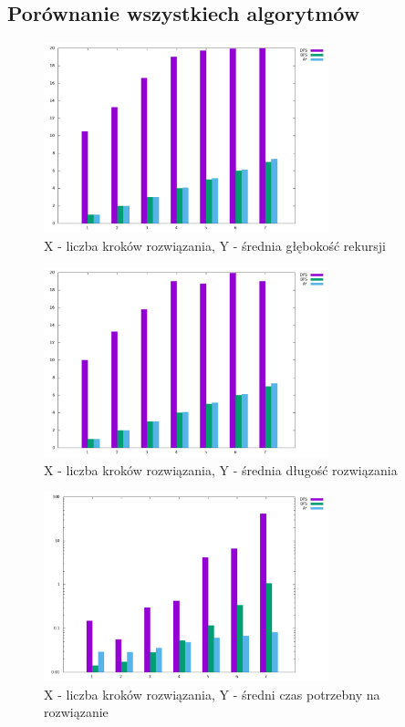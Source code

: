 \documentclass{classrep}
\begin{document}
{        \subsection{Porównanie wszystkiech algorytmów} {
            \begin{figure}[!htbp]
                \centering
                \includegraphics[width=\textwidth, height=55mm]{img/CMN_depth.png}
                \caption{X - liczba kroków rozwiązania, Y - średnia głębokość rekursji}
                \label{CMN_depth}
            \end{figure}

            \begin{figure}[!htbp]
                \centering
                \includegraphics[width=\textwidth, height=55mm]{img/CMN_length.png}
                \caption{X - liczba kroków rozwiązania, Y - średnia długość rozwiązania}
                \label{CMN_length}
            \end{figure}

            \begin{figure}[!htbp]
                \centering
                \includegraphics[width=\textwidth, height=55mm]{img/CMN_time.png}
                \caption{X - liczba kroków rozwiązania, Y - średni czas potrzebny na rozwiązanie}
                \label{CMN_time}
            \end{figure}

}}
\end{document}
